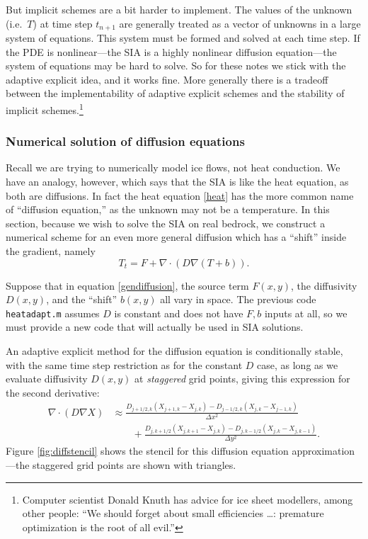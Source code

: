 \documentclass[titlepage,letterpaper,final,12pt]{scrartcl}
\newcommand{\grad}{\nabla}
\newcommand{\Div}{\nabla\cdot}
\begin{document}
But implicit schemes are a bit harder to implement.  The values of the unknown (i.e.~$T$) at time step $t_{n+1}$ are generally treated as a vector of unknowns in a large system of equations.  This system must be formed and solved at each time step.  If the PDE is nonlinear---the SIA is a highly nonlinear diffusion equation---the system of equations may be hard to solve.  So for these notes we stick with the adaptive explicit idea, and it works fine.  More generally there is a tradeoff between the implementability of adaptive explicit schemes and the stability of implicit schemes.\footnote{Computer scientist Donald Knuth has advice for ice sheet modellers, among other people: ``We should forget about small efficiencies \dots: premature optimization is the root of all evil.''}

\subsubsection*{Numerical solution of diffusion equations}  Recall we are trying to numerically model ice flows, not heat conduction.  We have an analogy, however, which says that the SIA is like the heat equation, as both are diffusions.  In fact the heat equation \eqref{heat} has the more common name of ``diffusion equation,'' as the unknown may not be a temperature.  In this section, because we wish to solve the SIA on real bedrock, we construct a numerical scheme for an even more general diffusion which has a ``shift'' inside the gradient, namely
\begin{equation}
  T_t = F + \Div \left(D \grad (T + b)\right). \label{gendiffusion}
\end{equation}

Suppose that in equation \eqref{gendiffusion}, the source term $F(x,y)$, the diffusivity $D(x,y)$, and the ``shift'' $b(x,y)$ all vary in space.  The previous code \texttt{heatadapt.m} assumes $D$ is constant and does not have $F,b$ inputs at all, so we must provide a new code that will actually be used in SIA solutions.

An adaptive explicit method for the diffusion equation is conditionally stable, with the same time step restriction as for the constant $D$ case, as long as we evaluate diffusivity $D(x,y)$ at \emph{staggered} grid points, giving this expression for the second derivative:
\begin{align*}
\Div \left(D \grad X\right) &\approx \frac{D_{j+1/2,k}(X_{j+1,k} - X_{j,k}) - D_{j-1/2,k}(X_{j,k} - X_{j-1,k})}{\Delta x^2} \\
	&\qquad + \frac{D_{j,k+1/2}(X_{j,k+1} - X_{j,k}) - D_{j,k-1/2}(X_{j,k} - X_{j,k-1})}{\Delta y^2}.
\end{align*}
Figure \ref{fig:diffstencil} shows the stencil for this diffusion equation approximation---the staggered grid points are shown with triangles.
\end{document}

